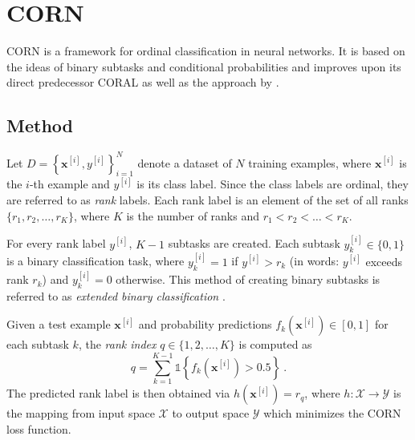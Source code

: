 \section{CORN} \label{sec:ordinal:corn}
\acf{CORN} \cite{corn}
is a framework for ordinal classification in neural networks.
It is based on the ideas of binary subtasks and conditional probabilities
and improves upon
  its direct predecessor \ac{CORAL} \cite{coral}
  as well as the approach by \citeauthor{extended_binary_nn} \cite{extended_binary_nn}.
%
%
%


\subsection{Method} \label{sec:corn:method}
%
Let $D = \left\{ \mathbf{x}^{[i]}, y^{[i]} \right\}_{i=1}^N$ denote a dataset of $N$ training examples,
where $\mathbf{x}^{[i]}$ is the $i$-th example and $y^{[i]}$ is its class label.
Since the class labels are ordinal, they are referred to as \emph{rank} labels.
Each rank label is an element of the set of all ranks $\{r_1, r_2, \ldots, r_K\}$,
  where
  $K$ is the number of ranks
  and $r_1 < r_2 < \ldots < r_K$.

For every rank label $y^{[i]}$,
$K - 1$ subtasks are created.
Each subtask $y^{[i]}_k \in \{0, 1\}$ is a binary classification task,
  where
    $y^{[i]}_k = 1$ if $y^{[i]} > r_k$ (in words: {$y^{[i]}$ exceeds rank $r_k$})
    and $y^{[i]}_k = 0$ otherwise.
This method of creating binary subtasks is referred to as \emph{extended binary classification} \cite{extended_binary}.

Given a test example $\mathbf{x}^{[i]}$
and probability predictions $f_k(\mathbf{x}^{[i]}) \in [0,1]$ for each subtask $k$,
the \emph{rank index} $q \in \{1, 2, \ldots, K\}$ is computed as
\begin{equation}
  q = \sum_{k=1}^{K-1} \mathbb{1}\left\{f_k(\mathbf{x}^{[i]}) > 0.5\right\} \ .
\end{equation}
The predicted rank label is then obtained via
$h(\mathbf{x}^{[i]}) = r_q$,
where $h: \mathcal{X} \to \mathcal{Y}$ is the mapping from input space $\mathcal{X}$ to output space $\mathcal{Y}$ %
which minimizes the CORN loss function.


